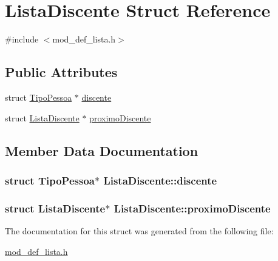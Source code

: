 \hypertarget{structListaDiscente}{\section{Lista\+Discente Struct Reference}
\label{structListaDiscente}
}


{\ttfamily \#include $<$mod\+\_\+def\+\_\+lista.\+h$>$}

\subsection*{Public Attributes}
\begin{DoxyCompactItemize}
\item 
struct \hyperlink{structTipoPessoa}{Tipo\+Pessoa} $\ast$ \hyperlink{structListaDiscente_a4a37d603bf93e277f41ef22bccd0f454}{discente}
\item 
struct \hyperlink{structListaDiscente}{Lista\+Discente} $\ast$ \hyperlink{structListaDiscente_a3445a5438472b3202723bc8bd7be5484}{proximo\+Discente}
\end{DoxyCompactItemize}


\subsection{Member Data Documentation}
\hypertarget{structListaDiscente_a4a37d603bf93e277f41ef22bccd0f454}{
\subsubsection[{discente}]{\setlength{\rightskip}{0pt plus 5cm}struct {\bf Tipo\+Pessoa}$\ast$ Lista\+Discente\+::discente}}\label{structListaDiscente_a4a37d603bf93e277f41ef22bccd0f454}
\hypertarget{structListaDiscente_a3445a5438472b3202723bc8bd7be5484}{
\subsubsection[{proximo\+Discente}]{\setlength{\rightskip}{0pt plus 5cm}struct {\bf Lista\+Discente}$\ast$ Lista\+Discente\+::proximo\+Discente}}\label{structListaDiscente_a3445a5438472b3202723bc8bd7be5484}


The documentation for this struct was generated from the following file\+:\begin{DoxyCompactItemize}
\item 
\hyperlink{mod__def__lista_8h}{mod\+\_\+def\+\_\+lista.\+h}\end{DoxyCompactItemize}
